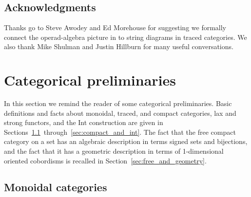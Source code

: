 \documentclass[11pt,oneside,article]{memoir}
\begin{document}
\section*{Acknowledgments}

Thanks go to Steve Awodey and Ed Morehouse for suggesting we formally connect the operad-algebra
picture in \cite{RupelSpivak} to string diagrams in traced categories. We also thank Mike Shulman
and Justin Hillburn for many useful conversations.

\chapter{Categorical preliminaries}\label{chap:traced_categories}

In this section we remind the reader of some categorical preliminaries. Basic definitions and facts
about monoidal, traced, and compact categories, lax and strong functors, and the Int construction
are given in Sections~\ref{sec:prelim_monoidal}~through~\ref{sec:compact_and_int}. The fact that
the free compact category on a set has an algebraic description in terms 
signed sets and bijections, and the fact that it has a geometric description in terms of 1-dimensional oriented
cobordisms is recalled in Section~\ref{sec:free_and_geometry}. 

\section{Monoidal categories}\label{sec:prelim_monoidal}
\end{document}
